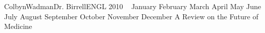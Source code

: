 \documentclass[12pt,letterpaper]{article}
\newcommand{\mladate}{%
\the\day\
\ifcase\the\month
\or January
\or February
\or March
\or April
\or May
\or June
\or July
\or August
\or September
\or October
\or November
\or December
\fi
\the\year }
\begin{document}
\begin{mla}{Colbyn}{Wadman}{Dr. Birrell}{ENGL 2010}{\mladate}{A Review on the Future of Medicine}










\end{mla}
\end{document}
